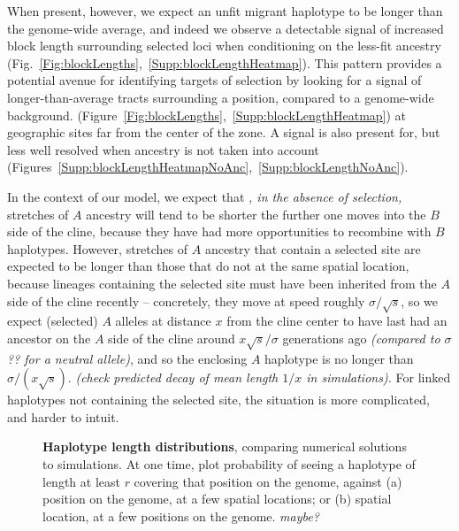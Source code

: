 \documentclass[12pt]{article}
\newcommand{\alisa}[1]{{\em \color{red} #1}}
\newcommand{\plr}[1]{{\em \color{blue} #1}}
\begin{document}
When present, however, we expect an unfit migrant haplotype to be longer than the genome-wide average, and indeed we observe a detectable signal of increased block length surrounding selected loci when conditioning on the less-fit ancestry (Fig.~\ref{Fig:blockLengths},~\ref{Supp:blockLengthHeatmap}). This pattern provides a potential avenue for identifying targets of selection by looking for a signal of longer-than-average tracts surrounding a position, compared to a genome-wide background. (Figure~\ref{Fig:blockLengths},~\ref{Supp:blockLengthHeatmap}) at geographic sites far from the center of the zone. A signal is also present for, but less well resolved when ancestry is not taken into account (Figures~\ref{Supp:blockLengthHeatmapNoAnc},~\ref{Supp:blockLengthNoAnc}).


In the context of our model, we expect that\alisa{, in the absence of selection,} stretches of $A$ ancestry will tend to be shorter the further one moves into the $B$ side of the cline,
because they have had more opportunities to recombine with $B$ haplotypes. 
However, stretches of $A$ ancestry that contain a selected site are expected to be longer
than those that do not at the same spatial location,
because lineages containing the selected site must have been inherited from the $A$ side of the cline recently --
concretely, they move at speed roughly $\sigma/\sqrt{s}$,
so we expect (selected) $A$ alleles at distance $x$ from the cline center
to have last had an ancestor on the $A$ side of the cline around $x \sqrt{s}/\sigma$ generations ago \alisa{(compared to $\sigma$?? for a neutral allele)},
and so the enclosing $A$ haplotype is no longer than $\sigma/(x \sqrt{s})$.
\plr{(check predicted decay of mean length $1/x$ in simulations).}
For linked haplotypes not containing the selected site, the situation is more complicated, and harder to intuit.


\begin{figure}
    \begin{center}
    \end{center}
    \caption{
        \textbf{Haplotype length distributions},
        comparing numerical solutions to simulations.
        At one time, plot 
        probability of seeing a haplotype of length at least $r$ covering that position on the genome,
        against (a) position on the genome, at a few spatial locations;
        or (b) spatial location, at a few positions on the genome.
        \plr{maybe?}
        \label{fig:haplotype_lengths}
    }
\end{figure}
\end{document}
